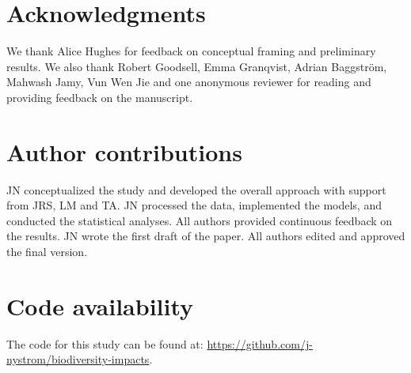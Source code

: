 
\section*{Acknowledgments}

We thank Alice Hughes for feedback on conceptual framing and preliminary results. We also thank Robert Goodsell, Emma Granqvist, Adrian Baggström, Mahwash Jamy, Vun Wen Jie and one anonymous reviewer for reading and providing feedback on the manuscript.

\section*{Author contributions}

JN conceptualized the study and developed the overall approach with support from JRS, LM and TA. JN processed the data, implemented the models, and conducted the statistical analyses. All authors provided continuous feedback on the results. JN wrote the first draft of the paper. All authors edited and approved the final version.

\section*{Code availability}

The code for this study can be found at: \url{https://github.com/j-nystrom/biodiversity-impacts}.
